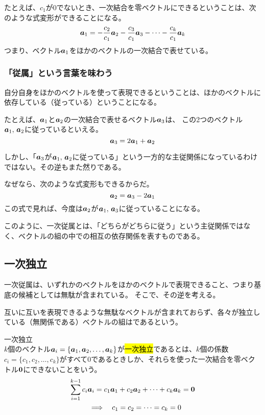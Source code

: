 \documentclass[../imaging-math]{subfiles}
\begin{document}
たとえば、$c_1$が$0$でないとき、一次結合を零ベクトルにできるということは、次のような式変形ができることになる。
\begin{equation*}
  \vb*{a}_1 = -\frac{c_2}{c_1} \vb*{a}_2 - \frac{c_3}{c_1} \vb*{a}_3 - \cdots - \frac{c_k}{c_1} \vb*{a}_{k}
\end{equation*}
つまり、ベクトル$\vb*{a}_1$をほかのベクトルの一次結合で表せている。

\subsubsection{「従属」という言葉を味わう}

自分自身をほかのベクトルを使って表現できるということは、ほかのベクトルに依存している（従っている）ということになる。

\br

たとえば、$\vb*{a}_1$と$\vb*{a}_2$の一次結合で表せるベクトル$\vb*{a}_3$は、 この2つのベクトル$\vb*{a}_1 ,\, \vb*{a}_2$に従っているといえる。
\begin{equation*}
  \vb*{a}_3 = 2 \vb*{a}_1 + \vb*{a}_2
\end{equation*}

しかし、「$\vb*{a}_3$が$\vb*{a}_1 ,\, \vb*{a}_2$に従っている」という一方的な主従関係になっているわけではない。その逆もまた然りである。

なぜなら、次のような式変形もできるからだ。
\begin{equation*}
  \vb*{a}_2 = \vb*{a}_3 - 2 \vb*{a}_1
\end{equation*}
この式で見れば、今度は$\vb*{a}_2$が$\vb*{a}_1 ,\, \vb*{a}_3$に従っていることになる。

\br

このように、一次従属とは、「どちらがどちらに従う」という主従関係ではなく、ベクトルの組の中での相互の依存関係を表すものである。

\subsection{一次独立}

一次従属は、いずれかのベクトルをほかのベクトルで表現できること、つまり基底の候補としては無駄が含まれている。
そこで、その逆を考える。

\br

互いに互いを表現できるような無駄なベクトルが含まれておらず、各々が独立している（無関係である）ベクトルの組はであるという。

\begin{definition}{一次独立}\quad\\
  $k$個のベクトル$\vb*{a}_i = \{ \vb*{a}_1, \vb*{a}_2, \ldots, \vb*{a}_k \}$が\hl{一次独立}であるとは、$k$個の係数$c_i = \{c_1, c_2, \ldots, c_k\}$がすべて$0$であるときしか、それらを使った一次結合を零ベクトル$\vb{0}$にできないことをいう。
  \large
  \begin{gather*}
    \sum_{i=1}^{k-1} c_i \vb*{a}_i = c_1 \vb*{a}_1 + c_2 \vb*{a}_2 + \cdots + c_k\vb*{a}_{k} = \vb{0} \\ \quad\Longrightarrow \quad c_1 = c_2 = \cdots = c_k = 0
  \end{gather*}
\end{definition}
\end{document}
